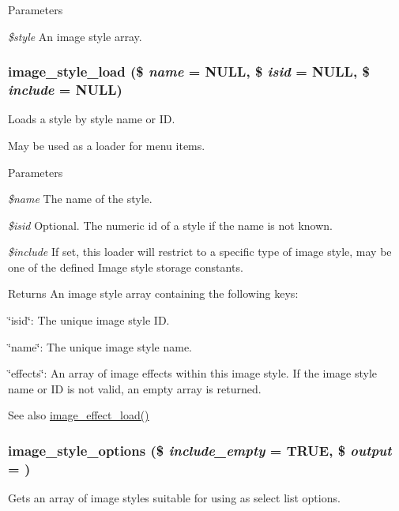 \begin{DoxyParams}{Parameters}
\item[{\em \$style}]An image style array. \end{DoxyParams}
\hypertarget{image_8module_a0d7388bec5f42788968823a8099a64a7}{
\subsubsection[{image\_\-style\_\-load}]{\setlength{\rightskip}{0pt plus 5cm}image\_\-style\_\-load (\$ {\em name} = {\ttfamily NULL}, \/  \$ {\em isid} = {\ttfamily NULL}, \/  \$ {\em include} = {\ttfamily NULL})}}
\label{image_8module_a0d7388bec5f42788968823a8099a64a7}
Loads a style by style name or ID.

May be used as a loader for menu items.


\begin{DoxyParams}{Parameters}
\item[{\em \$name}]The name of the style. \item[{\em \$isid}]Optional. The numeric id of a style if the name is not known. \item[{\em \$include}]If set, this loader will restrict to a specific type of image style, may be one of the defined Image style storage constants.\end{DoxyParams}
\begin{DoxyReturn}{Returns}
An image style array containing the following keys:
\begin{DoxyItemize}
\item \char`\"{}isid\char`\"{}: The unique image style ID.
\item \char`\"{}name\char`\"{}: The unique image style name.
\item \char`\"{}effects\char`\"{}: An array of image effects within this image style. If the image style name or ID is not valid, an empty array is returned. 
\end{DoxyItemize}
\end{DoxyReturn}
\begin{DoxySeeAlso}{See also}
\hyperlink{image_8module_a7ad62224057dbc7757dfa2df898926ad}{image\_\-effect\_\-load()} 
\end{DoxySeeAlso}
\hypertarget{image_8module_a2c69d85e23ccb050a6f01832f41d3e5a}{
\subsubsection[{image\_\-style\_\-options}]{\setlength{\rightskip}{0pt plus 5cm}image\_\-style\_\-options (\$ {\em include\_\-empty} = {\ttfamily TRUE}, \/  \$ {\em output} = {})}}
\label{image_8module_a2c69d85e23ccb050a6f01832f41d3e5a}
Gets an array of image styles suitable for using as select list options.


